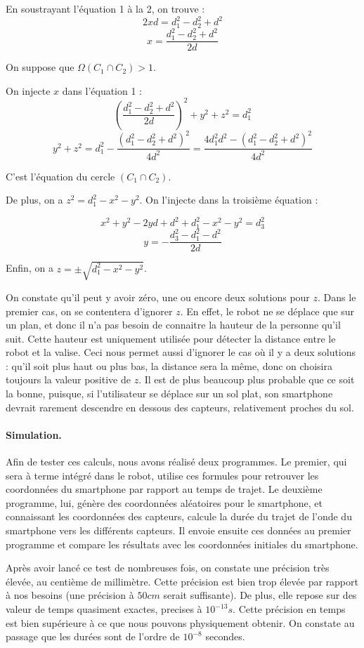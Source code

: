 \documentclass{article}
\begin{document}
En soustrayant l'équation 1 à la 2, on trouve :
\[2xd=d_1^2-d_2^2+d^2\]
\[x = \frac{d_1^2- d_2^2 + d^2}{2d}\]

On suppose que $\Omega(C_1 \cap C_2) > 1$.

On injecte $x$ dans l'équation 1 :
\[ \left(\frac{d_1^2-d_2^2+d^2}{2d}\right)^2 + y^2 + z^2 = d_1^2 \]
\[ y^2 + z^2 = d_1^2 - \frac{(d_1^2 - d_2^2 + d^2)^2}{4d^2} = \frac{4d_1^2d^2 - (d_1^2 - d_2^2 + d^2)^2}{4d^2} \]

C'est l'équation du cercle $(C_1 \cap C_2)$.

De plus, on a $z^2 = d_1^2-x^2-y^2$. On l'injecte dans la troisième équation :

\[ x^2 + y^2 - 2yd + d^2 + d_1^2 - x^2 - y^2 = d_3^2 \]
\[ y = -\frac{d_3^2 - d_1^2 - d^2}{2d} \]

Enfin, on a $z = \pm\sqrt{d_1^2-x^2-y^2}$.

On constate qu'il peut y avoir zéro, une ou encore deux solutions pour $z$. Dans le premier cas, on se contentera d'ignorer $z$. En effet, le robot ne se déplace que sur un plan, et donc il n'a pas besoin de connaitre la hauteur de la personne qu'il suit. Cette hauteur est uniquement utilisée pour détecter la distance entre le robot et la valise. Ceci nous permet aussi d'ignorer le cas où il y a deux solutions : qu'il soit plus haut ou plus bas, la distance sera la même, donc on choisira toujours la valeur positive de $z$. Il est de plus beaucoup plus probable que ce soit la bonne, puisque, si l'utilisateur se déplace sur un sol plat, son smartphone devrait rarement descendre en dessous des capteurs, relativement proches du sol.

\paragraph{Simulation.}
Afin de tester ces calculs, nous avons réalisé deux programmes. Le premier, qui sera à terme intégré dans le robot, utilise ces formules pour retrouver les coordonnées du smartphone par rapport au temps de trajet. Le deuxième programme, lui, génère des coordonnées aléatoires pour le smartphone, et connaissant les coordonnées des capteurs, calcule la durée du trajet de l'onde du smartphone vers les différents capteurs. Il envoie ensuite ces données au premier programme et compare les résultats avec les coordonnées initiales du smartphone.

Après avoir lancé ce test de nombreuses fois, on constate une précision très élevée, au centième de millimètre. Cette précision est bien trop élevée par rapport à nos besoins (une précision à $50cm$ serait suffisante). De plus, elle repose sur des valeur de temps quasiment exactes, precises à $10^{-13}s$. Cette précision en temps est bien supérieure à ce que nous pouvons physiquement obtenir. On constate au passage que les durées sont de l'ordre de $10^{-8}$ secondes.
\end{document}
